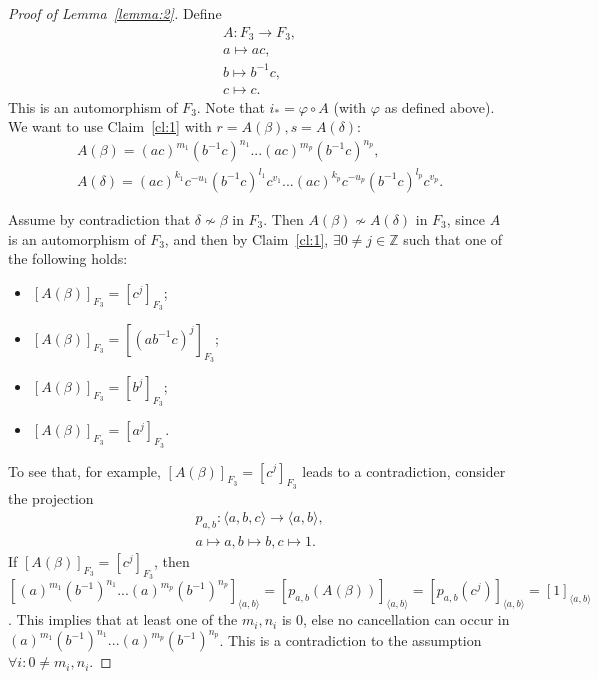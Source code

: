 \documentclass[11pt]{article}
\newenvironment{myequation}
    {
        \begin{equation*}
        \begin{gathered}
    }
    { 
        \end{gathered} 
        \end{equation*}
    }
\newcommand{\Z}{\mathbb{Z}}
\begin{document}
    \begin{proof}[Proof of Lemma~\ref{lemma:2}]
        Define
        \begin{myequation}
            A : F_3 \to F_3 ,\\
            a \mapsto ac ,\\
            b \mapsto b^{-1}c ,\\
            c \mapsto c .
        \end{myequation}
        This is an automorphism of $F_3$. Note that $i_* = \varphi \circ A$ (with $\varphi$ as defined above). We want to use Claim~\ref{cl:1} with $r = A(\beta), s = A(\delta)$:
        \begin{myequation}
            A(\beta) = (ac)^{m_1} (b^{-1}c)^{n_1} ... (ac)^{m_p} (b^{-1}c)^{n_p} ,\\
            A(\delta) = (ac)^{k_1} c^{-u_1} (b^{-1}c)^{l_1} c^{v_1} ... (ac)^{k_p} c^{-u_p} (b^{-1}c)^{l_p} c^{v_p} .
        \end{myequation}
        
        Assume by contradiction that $\delta \not\sim \beta$ in $F_3$. Then $A(\beta) \not\sim A(\delta)$ in $F_3$, since $A$ is an automorphism of $F_3$, and then by Claim~\ref{cl:1}, $\exists 0 \neq j \in \Z$ such that one of the following holds:
        \begin{itemize}
            \item $[A(\beta)]_{F_3} = [c^j]_{F_3}$;
            \item $[A(\beta)]_{F_3} = [(ab^{-1}c)^j]_{F_3}$;
            \item $[A(\beta)]_{F_3} = [b^j]_{F_3}$;
            \item $[A(\beta)]_{F_3} = [a^j]_{F_3}$.
        \end{itemize}
        
        To see that, for example, $[A(\beta)]_{F_3} = [c^j]_{F_3}$ leads to a contradiction, consider the projection
        \begin{myequation}
            p_{a,b} : \langle a,b,c \rangle \to \langle a,b \rangle ,\\
            a \mapsto a, b \mapsto b, c \mapsto 1 .
        \end{myequation}
        If $[A(\beta)]_{F_3} = [c^j]_{F_3}$, then $[(a)^{m_1} (b^{-1})^{n_1} ... (a)^{m_p} (b^{-1})^{n_p}]_{\langle a,b \rangle} = [p_{a,b}(A(\beta))]_{\langle a,b \rangle} = [p_{a,b}(c^j)]_{\langle a,b \rangle} = [1]_{\langle a,b \rangle}$. This implies that at least one of the $m_i,n_i$ is $0$, else no cancellation can occur in $(a)^{m_1} (b^{-1})^{n_1} ... (a)^{m_p} (b^{-1})^{n_p}$. This is a contradiction to the assumption $\forall i: 0 \neq m_i,n_i$.
        

\end{proof}
\end{document}
